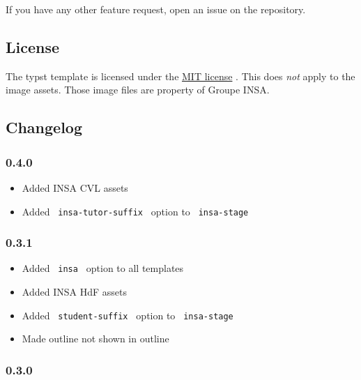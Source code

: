 If you have any other feature request, open an issue on the repository.

\subsection{License}\label{license}

The typst template is licensed under the
\href{https://github.com/SkytAsul/INSA-Typst-Template/blob/main/LICENSE}{MIT
license} . This does \emph{not} apply to the image assets. Those image
files are property of Groupe INSA.

\subsection{Changelog}\label{changelog}

\subsubsection{0.4.0}\label{section}

\begin{itemize}
\tightlist
\item
  Added INSA CVL assets
\item
  Added \texttt{\ insa-tutor-suffix\ } option to \texttt{\ insa-stage\ }
\end{itemize}

\subsubsection{0.3.1}\label{section-1}

\begin{itemize}
\tightlist
\item
  Added \texttt{\ insa\ } option to all templates
\item
  Added INSA HdF assets
\item
  Added \texttt{\ student-suffix\ } option to \texttt{\ insa-stage\ }
\item
  Made outline not shown in outline
\end{itemize}

\subsubsection{0.3.0}\label{section-2}

